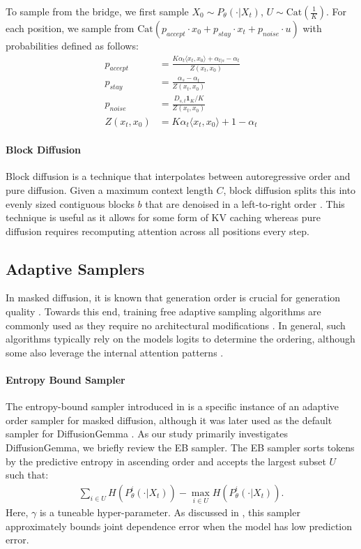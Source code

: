 To sample from the bridge, we first sample $X_0 \sim P_{\theta}(\cdot | X_t)$, $U \sim \text{Cat}(\frac{1}{K})$.
For each position, we sample from $\text{Cat}(p_{accept} \cdot x_0 + p_{stay} \cdot x_t + p_{noise} \cdot u)$ with probabilities defined as follows: 
\begin{align}
\label{eq:true-rev-coords}
    p_{accept} &= \frac{K\alpha_t \langle x_t, x_0 \rangle + \alpha_{t|s} - \alpha_t}{Z(x_t, x_0)} \\
    p_{stay} &= \frac{\alpha_s - \alpha_t}{Z(x_t, x_0)} \\
    p_{noise} &= \frac{D_{s,t} \mathbf{1}_K / K}{Z(x_t, x_0)} \\
    Z(x_t, x_0) &= K \alpha_{t} \langle x_t, x_0 \rangle + 1 - \alpha_t
\end{align}

\paragraph{Block Diffusion}
Block diffusion is a technique that interpolates between autoregressive order and pure diffusion. Given a maximum context length $C$, block diffusion splits this into evenly sized contiguous blocks $b$ that are denoised in a left-to-right order \citep{arriola2025blockdiffusioninterpolatingautoregressive, deschenaux2026blockgen}. 
This technique is useful as it allows for some form of KV caching whereas pure diffusion requires recomputing attention across all positions every step.

\subsection{Adaptive Samplers}
In masked diffusion, it is known that generation order is crucial for generation quality \citep{kim2025train}.
Towards this end, training free adaptive sampling algorithms are commonly used as they require no architectural modifications \citep{nie2026large, ye2025dream7bdiffusionlarge}.
In general, such algorithms typically rely on the models logits to determine the ordering, although some also leverage the internal attention patterns \citep{kim2026klass, wu2026fast}.

\paragraph{Entropy Bound Sampler}
The entropy-bound sampler introduced in \citet{ben2026accelerated} is a specific instance of an adaptive order sampler for masked diffusion, although it was later used as the default sampler for DiffusionGemma \citep{team2026diffusiongemma}.
As our study primarily investigates DiffusionGemma, we briefly review the EB sampler.
The EB  sampler sorts tokens by the predictive entropy in ascending order and accepts the largest subset $U$ such that: 
\begin{align}
    \label{eq:eb-bound}
    \sum_{i \in U} H(P_{\theta}^i(\cdot | X_t)) - \max_{i \in U}  H(P_{\theta}^i(\cdot | X_t)).
\end{align}
Here, $\gamma$ is a tuneable hyper-parameter. As discussed in \citet{ben2026accelerated}, this sampler approximately bounds joint dependence error when the model has low prediction error. 


